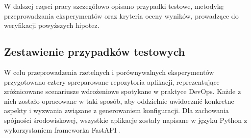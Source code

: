 \bigskip

W dalszej częsci pracy szczegółowo opisano przypadki testowe, metodykę przeprowadzania eksperymentów oraz kryteria oceny wyników, prowadzące do weryfikacji powyższych hipotez.

\subsection{Zestawienie przypadków testowych}

W celu przeprowadzenia rzetelnych i porównywalnych eksperymentów przygotowano cztery spreparowane repozytoria aplikacji, reprezentujące zróżnicowane scenariusze wdrożeniowe spotykane w praktyce DevOps. Każde z nich zostało opracowane w taki sposób, aby oddzielnie uwidocznić konkretne aspekty i wyzwania związane z generowaniem konfiguracji. Dla zachowania spójności środowiskowej, wszystkie aplikacje zostały napisane w języku Python z wykorzystaniem frameworka FastAPI \cite{fastapi}.

